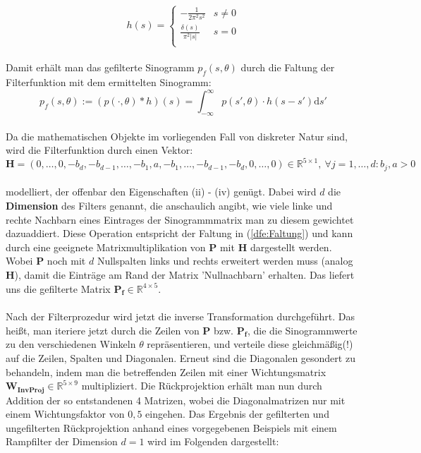         \begin{equation*}
        	h(s) = \begin{cases}
        				- \frac{1}{2 \pi^2 s^2} & s \neq 0\\
        				\frac{\delta(s)}{\pi^2 |s|} & s = 0\\
        			\end{cases}
        \end{equation*}\\
        Damit erhält man das gefilterte Sinogramm $p_f(s,\theta)$ durch die Faltung der Filterfunktion mit dem ermittelten Sinogramm:
        \begin{equation}\label{dfe:Faltung}
                	p_f(s,\theta) := (p(\cdot, \theta) \ast h) (s) = \int_{-\infty}^{\infty}  p(s', \theta) \cdot h(s-s') \mathrm{d}s'
        \end{equation}\\
        Da die mathematischen Objekte im vorliegenden Fall von diskreter Natur sind, wird die Filterfunktion durch einen Vektor:
        \begin{equation*}
        		\boldsymbol{H} = (0, \dots , 0, -b_d,-b_{d-1}, \dots, -b_1,a,-b_1, \dots, -b_{d-1}, -b_d,0, \dots, 0) \in \mathbb{R}^{5 \times 1},\ \forall j = 1,\dots, d: b_j, a > 0
        \end{equation*}\\  
        modelliert, der offenbar den Eigenschaften (ii) - (iv) genügt. Dabei wird $d$ die \textbf{Dimension} des Filters genannt, die anschaulich angibt, wie viele linke und rechte Nachbarn eines Eintrages der Sinogrammmatrix man zu diesem gewichtet dazuaddiert. Diese Operation entspricht der Faltung in (\ref{dfe:Faltung}) und kann durch eine geeignete Matrixmultiplikation von $\boldsymbol{P}$ mit $\boldsymbol{H}$  dargestellt werden. Wobei $\boldsymbol{P}$ noch mit $d$ Nullspalten links und rechts erweitert werden muss (analog $\boldsymbol{H}$), damit die Einträge am Rand der Matrix 'Nullnachbarn' erhalten. Das liefert uns die gefilterte Matrix $\boldsymbol{P_f} \in \mathbb{R}^{4\times 5}$.\\
        \ \\
        Nach der Filterprozedur wird jetzt die inverse Transformation durchgeführt. Das heißt, man iteriere jetzt durch die Zeilen von $\boldsymbol{P}$ bzw. $\boldsymbol{P_f}$, die die Sinogrammwerte zu den verschiedenen Winkeln $\theta$ repräsentieren, und verteile diese gleichmäßig(!) auf die Zeilen, Spalten und Diagonalen. Erneut sind die Diagonalen gesondert zu behandeln, indem man die betreffenden Zeilen mit einer Wichtungsmatrix $\boldsymbol{W_{InvProj}} \in \mathbb{R}^{5 \times 9}$ multipliziert. Die Rückprojektion erhält man nun durch Addition der so entstandenen 4 Matrizen, wobei die Diagonalmatrizen nur mit einem Wichtungsfaktor von $0,5$ eingehen. Das Ergebnis der gefilterten und ungefilterten Rückprojektion anhand eines vorgegebenen Beispiels mit einem Rampfilter der Dimension $d=1$ wird im Folgenden dargestellt:\\
